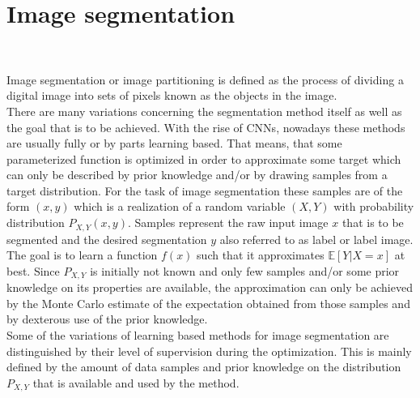 \section{Image segmentation}~\label{sec:prel_imagesegmentation}

Image segmentation or image partitioning is defined as the process of dividing a digital image into sets of pixels known as the objects in the image.\\
There are many variations concerning the segmentation method itself as well as the goal that is to be achieved. With the rise of CNNs, nowadays these methods are usually fully or by parts learning based. That means, that some parameterized function is optimized in order to approximate some target which can only be described by prior knowledge and/or by drawing samples from a target distribution. For the task of image segmentation these samples are of the form $(x, y)$ which is a realization of a random variable $(X, Y)$ with probability distribution $P_{X, Y}(x, y)$. Samples represent the raw input image $x$ that is to be segmented and the desired segmentation $y$ also referred to as label or label image. The goal is to learn a function $f(x)$ such that it approximates $\mathbb{E}[Y|X=x]$ at best. Since $P_{X, Y}$ is initially not known and only few samples and/or some prior knowledge on its properties are available, the approximation can only be achieved by the Monte Carlo estimate of the expectation obtained from those samples and by dexterous use of the prior knowledge. \\
Some of the variations of learning based methods for image segmentation are distinguished by their level of supervision during the optimization. This is mainly defined by the amount of data samples and prior knowledge on the distribution $P_{X, Y}$ that is available and used by the method.

